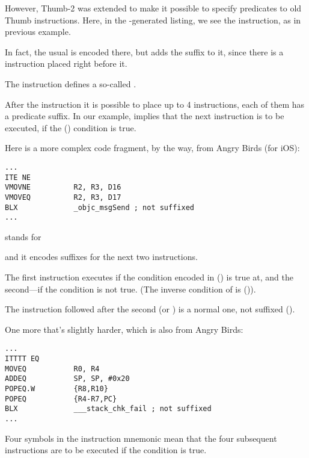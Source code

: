 
However, Thumb-2 was extended to make it possible to specify predicates to old Thumb instructions.
Here, in the \IDA-generated listing, we see the  instruction, as in previous example.

In fact, the usual  is encoded there, but \IDA adds the  suffix to it, 
since there is a  instruction placed right before it.

\label{ARM_Thumb_IT}
The  instruction defines a so-called . 

After the instruction it is possible to place up to 4 instructions, 
each of them has a predicate suffix.
In our example,  implies that the next instruction is to be executed, if the  () condition is true.

Here is a more complex code fragment, by the way, from Angry Birds (for iOS):

\begin{lstlisting}[caption=Angry Birds Classic]
...
ITE NE
VMOVNE          R2, R3, D16
VMOVEQ          R2, R3, D17
BLX             _objc_msgSend ; not suffixed
...
\end{lstlisting}

 stands for  

and it encodes suffixes for the next two instructions.

The first instruction executes if the condition encoded in  () is true at, and the second---if the condition is not true.
(The inverse condition of  is  ()).

The instruction followed after the second  (or ) is a normal one, not suffixed ().

One more that's slightly harder, which is also from Angry Birds:

\begin{lstlisting}[caption=Angry Birds Classic]
...
ITTTT EQ
MOVEQ           R0, R4
ADDEQ           SP, SP, #0x20
POPEQ.W         {R8,R10}
POPEQ           {R4-R7,PC}
BLX             ___stack_chk_fail ; not suffixed
...
\end{lstlisting}

Four  symbols in the instruction mnemonic mean that the four subsequent instructions are to be executed if the condition is true.

